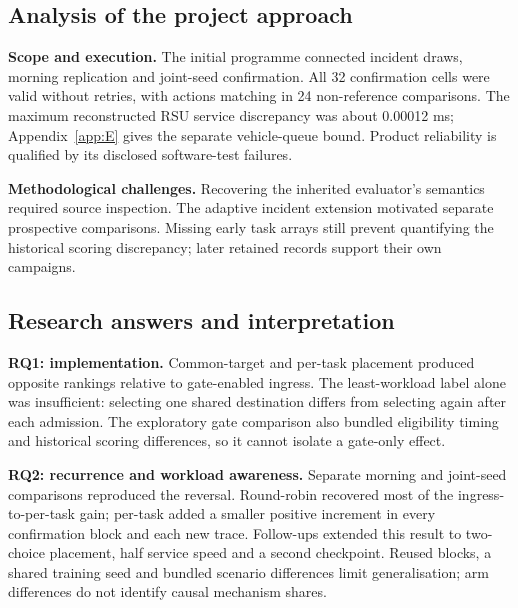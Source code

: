\documentclass[12pt,a4paper]{article}
\begin{document}
\FloatBarrier
\subsection{Analysis of the project approach}\label{sec:4.2}

\textbf{Scope and execution.} The initial programme connected incident draws, morning replication and joint-seed confirmation. All 32 confirmation cells were valid without retries, with actions matching in 24 non-reference comparisons. The maximum reconstructed RSU service discrepancy was about 0.00012 ms; Appendix~\ref{app:E} gives the separate vehicle-queue bound. Product reliability is qualified by its disclosed software-test failures.



\textbf{Methodological challenges.} Recovering the inherited evaluator's semantics required source inspection. The adaptive incident extension motivated separate prospective comparisons. Missing early task arrays still prevent quantifying the historical scoring discrepancy; later retained records support their own campaigns.

\FloatBarrier
\subsection{Research answers and interpretation}\label{sec:4.3}

\textbf{RQ1: implementation.} Common-target and per-task placement produced opposite rankings relative to gate-enabled ingress. The least-workload label alone was insufficient: selecting one shared destination differs from selecting again after each admission. The exploratory gate comparison also bundled eligibility timing and historical scoring differences, so it cannot isolate a gate-only effect.

\textbf{RQ2: recurrence and workload awareness.} Separate morning and joint-seed comparisons reproduced the reversal. Round-robin recovered most of the ingress-to-per-task gain; per-task added a smaller positive increment in every confirmation block and each new trace. Follow-ups extended this result to two-choice placement, half service speed and a second checkpoint. Reused blocks, a shared training seed and bundled scenario differences limit generalisation; arm differences do not identify causal mechanism shares.
\end{document}
